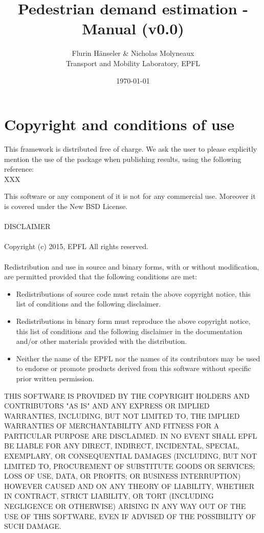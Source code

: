 \documentclass[a4paper,12pt]{article}
\begin{document}
\setlength{\parindent}{0pt}

\title{Pedestrian demand estimation - Manual (v0.0)}
\author{Flurin H\"anseler \& Nicholas Molyneaux \\ Transport and Mobility Laboratory, EPFL}
\date{\today}
\maketitle
\tableofcontents
\newpage
\section{Copyright and conditions of use}
This framework is distributed free of charge. We ask the user to please explicitly mention the use of the package when publishing results, using the following reference:\\
XXX

This software or any component of it is not for any commercial use. Moreover it is covered under the New BSD License.\\
\\
DISCLAIMER\\
\\
Copyright (c) 2015, EPFL All rights reserved.\\
\\
Redistribution and use in source and binary forms, with or without modification, are permitted provided that the following conditions are met:
\begin{itemize}
\item Redistributions of source code must retain the above copyright notice, this list of conditions and the following disclaimer.
\item Redistributions in binary form must reproduce the above copyright notice, this list of conditions and the following disclaimer in the documentation and/or other materials provided with the distribution.
\item Neither the name of the EPFL nor the names of its contributors may be used to endorse or promote products derived from this software without specific prior written permission.
\end{itemize}
THIS SOFTWARE IS PROVIDED BY THE COPYRIGHT HOLDERS AND CONTRIBUTORS "AS IS" AND ANY EXPRESS OR IMPLIED WARRANTIES, INCLUDING, BUT NOT LIMITED TO, THE IMPLIED WARRANTIES OF MERCHANTABILITY AND FITNESS FOR A PARTICULAR PURPOSE ARE DISCLAIMED. IN NO EVENT SHALL EPFL BE LIABLE FOR ANY DIRECT, INDIRECT, INCIDENTAL, SPECIAL, EXEMPLARY, OR CONSEQUENTIAL DAMAGES (INCLUDING, BUT NOT LIMITED TO, PROCUREMENT OF SUBSTITUTE GOODS OR SERVICES; LOSS OF USE, DATA, OR PROFITS; OR BUSINESS INTERRUPTION) HOWEVER CAUSED AND ON ANY THEORY OF LIABILITY, WHETHER IN CONTRACT, STRICT LIABILITY, OR TORT (INCLUDING NEGLIGENCE OR OTHERWISE) ARISING IN ANY WAY OUT OF THE USE OF THIS SOFTWARE, EVEN IF ADVISED OF THE POSSIBILITY OF SUCH DAMAGE.
\newpage
\end{document}
